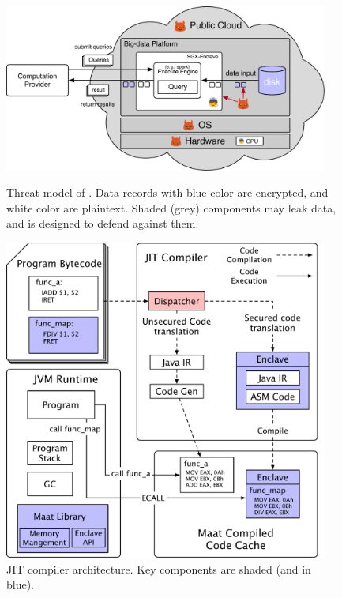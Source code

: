 \begin{figure}[h]
    \centering
    \begin{minipage}{.4\textwidth}    
          \vspace{-.1in}
        \includegraphics[width=0.95\textwidth]{figures/threat_public.pdf}
        \caption{Threat model of \maat. Data records with blue color are 
encrypted, and white color are plaintext. Shaded (grey) components may leak 
data, and \maat is designed to defend against them.}
        \label{fig:maat-threat}
    \end{minipage}
    \hspace{.2in} 
    \centering
    \begin{minipage}{0.4\textwidth}
         \vspace{-.1in}
        \includegraphics[width=0.95\textwidth]{figures/jit_arch.pdf}
         \vspace{-.1in}
        \caption{\maat JIT compiler architecture. Key components are 
shaded (and in blue).}
        \label{fig:maat-arch}
    \end{minipage}
\end{figure}

